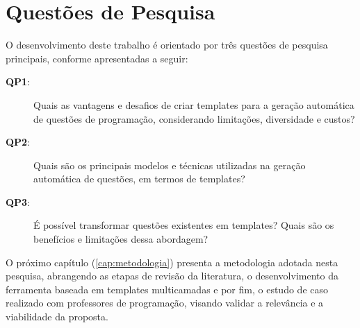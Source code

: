 \section{Questões de Pesquisa}

O desenvolvimento deste trabalho é orientado por três questões de pesquisa principais, conforme apresentadas a seguir:\\

\begin{description}
    \item[\textbf{QP1}:] Quais as vantagens e desafios de criar templates para a geração automática de questões de programação, considerando limitações, diversidade e custos?
    \item[\textbf{QP2}:] Quais são os principais modelos e técnicas utilizadas na geração automática de questões, em termos de templates?
    \item[\textbf{QP3}:] É possível transformar questões existentes em templates? Quais são os benefícios e limitações dessa abordagem?
\end{description}

O próximo capítulo (\autoref{cap:metodologia})  presenta a metodologia adotada nesta pesquisa, abrangendo as etapas de revisão da literatura, o desenvolvimento da ferramenta baseada em templates multicamadas e por fim, o estudo de caso realizado com professores de programação, visando validar a relevância e a viabilidade da proposta.  




